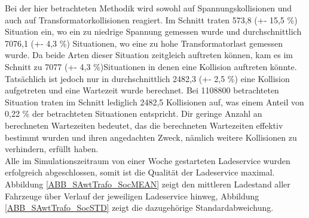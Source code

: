 Bei der hier betrachteten Methodik wird sowohl auf Spannungskollisionen und auch auf Transformatorkollisionen reagiert. Im Schnitt traten 573,8 (+- 15,5 \%) Situation ein, wo ein zu niedrige Spannung gemessen wurde und durchschnittlich 7076,1 (+- 4,3 \%) Situationen, wo eine zu hohe Transformatorlast gemessen wurde. Da beide Arten dieser Situation zeitgleich auftreten können, kam es im Schnitt zu 7077 (+- 4,3 \%)Situationen in denen eine Kollision auftreten könnte. Tatsächlich ist jedoch nur in durchschnittlich 2482,3 (+- 2,5 \%) eine Kollision aufgetreten und eine Wartezeit wurde berechnet. Bei 1108800 betrachteten Situation traten im Schnitt lediglich 2482,5 Kollisionen auf, was einem Anteil von 0,22 \% der betrachteten Situationen entspricht. Dir geringe Anzahl an berechneten Wartezeiten bedeutet, das die berechneten Wartezeiten effektiv bestimmt wurden und ihren angedachten Zweck, nämlich weitere Kollisionen zu verhindern, erfüllt haben.\\
Alle im Simulationszeitraum von einer Woche gestarteten Ladeservice wurden erfolgreich abgeschlossen, somit ist die Qualität der Ladeservice maximal. Abbildung \ref{ABB_SAwtTrafo_SocMEAN} zeigt den mittleren Ladestand aller Fahrzeuge über Verlauf der jeweiligen Ladeservice hinweg, Abbildung \ref{ABB_SAwtTrafo_SocSTD} zeigt die dazugehörige Standardabweichung.\\
